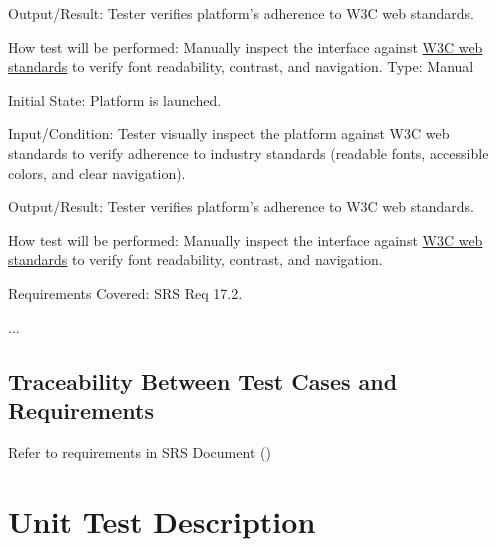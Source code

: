 \documentclass[12pt, titlepage]{article}
\begin{document}
\begin{enumerate}
        Output/Result: Tester verifies platform's adherence to W3C web standards.

        How test will be performed: Manually inspect the interface against \href{https://www.w3.org/standards/}{W3C web standards} to verify font readability, contrast, and navigation.
Type: Manual
					
Initial State: Platform is launched.
					
Input/Condition: Tester visually inspect the platform against W3C web standards to verify adherence to industry standards (readable fonts, accessible colors, and clear navigation).
					
Output/Result: Tester verifies platform's adherence to W3C web standards.
					
How test will be performed: Manually inspect the interface against \href{https://www.w3.org/standards/}{W3C web standards} to verify font readability, contrast, and navigation.

Requirements Covered: SRS Req 17.2.
\end{enumerate}

...

\subsection{Traceability Between Test Cases and Requirements}

Refer to requirements in SRS Document () 

\section{Unit Test Description}



\end{document}
